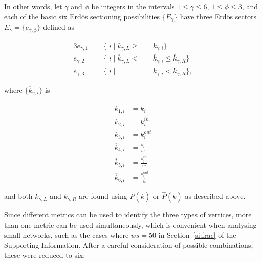 \documentclass[%
aip,
jmp,%
amsmath,amssymb,
reprint,%
]{revtex4-1}
\begin{document}
In other words, let $\gamma$ and $\phi$ be integers in the intervals $1 \leq \gamma \leq 6$, $1 \leq \phi \leq 3$, and each of the basic six Erd\"os sectioning possibilities $\{E_{\gamma}\}$ have three Erd\"os sectors $E_{\gamma}= \{e_{\gamma, \phi} \}$ defined as

\begin{alignat}{3}\label{eq:part}
e_{\gamma,1}&=\{\;i\;|\;\overline{k}_{\gamma,L}\geq&&\overline{k}_{\gamma,i}\} \nonumber \\
e_{\gamma,2}&=\{\;i\;|\;\overline{k}_{\gamma,L}<\;&&\overline{k}_{\gamma,i}\leq\overline{k}_{\gamma,R}\} \\ 
e_{\gamma,3}&=\{\;i\;|\;&&\overline{k}_{\gamma,i}<\overline{k}_{\gamma,R}\} \nonumber,
\end{alignat}

\noindent where $\{\overline{k}_{\gamma,i}\}$ is

\begin{equation}
\begin{split}
\overline{k}_{1,i}&=k_i \\
\overline{k}_{2,i}&=k_i^{in} \\
\overline{k}_{3,i}&=k_i^{out} \\
\overline{k}_{4,i}&=\frac{s_i}{\overline{w}} \\
\overline{k}_{5,i}&=\frac{s_i^{in}}{\overline{w}} \\
\overline{k}_{6,i}&=\frac{s_i^{out}}{\overline{w}}
\end{split}
\end{equation}

\noindent and both $\overline{k}_{\gamma,L}$ and $\overline{k}_{\gamma,R}$ are found using $P(\overline{k})$ or $\hat{P}(\overline{k})$ as described above.

Since different metrics can be used to identify the three types of vertices, more than one metric can be used simultaneously, which is convenient when analysing small networks,
such as the cases where $ws=50$ in Section~\ref{si:frac} of the Supporting Information.
After a careful consideration of possible combinations, these were reduced to six:
\end{document}
